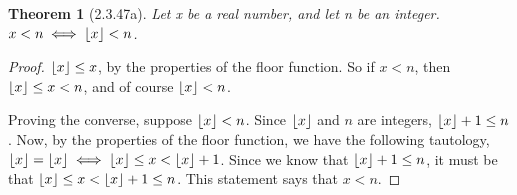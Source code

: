 \documentclass[a4paper, 12pt]{article}
\theoremstyle{plain}
\newtheorem*{theorem*}{Theorem}
\DeclarePairedDelimiter{\floor}{\lfloor}{\rfloor}
\begin{document}
	
	\begin{theorem*}[2.3.47a]
		Let x be a real number, and let n be an integer. \newline $x < n \iff \floor{x} < n$.
	\end{theorem*}
	
	\begin{proof}
		$\floor{x} \le x$, by the properties of the floor function. So if $x < n$, then 
		$\floor{x} \le x < n$, and of course $\floor{x} < n$.
		
		Proving the converse, suppose $\floor{x} < n$. Since $\floor{x}$ and $n$ are integers, 
		$\floor{x} + 1 \le n$. Now, by the properties of the floor function, we have the following 
		tautology, $\floor{x} = \floor{x} \iff \floor{x} \le x < \floor{x} + 1$. Since we know 
		that $\floor{x} + 1 \le n$, it must be that $\floor{x} \le x < \floor{x} + 1 \le n$. This 
		statement says that $x < n$.
	\end{proof}
\end{document}
